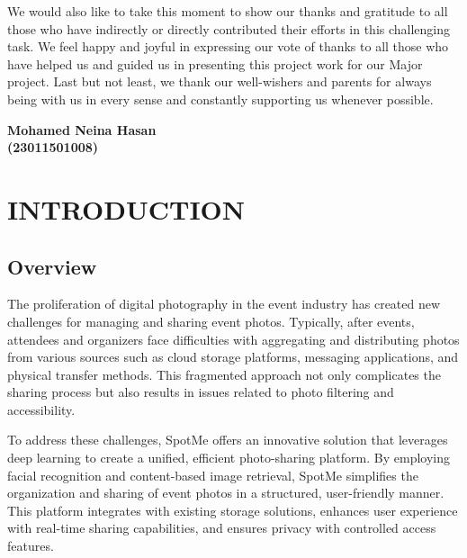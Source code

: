 \documentclass[12pt,a4paper]{report}
\begin{document}
We would also like to take this moment to show our thanks and gratitude to all those who have indirectly or directly contributed their efforts in this challenging task. We feel happy and joyful in expressing our vote of thanks to all those who have helped us and guided us in presenting this project work for our Major project. Last but not least, we thank our well-wishers and parents for always being with us in every sense and constantly supporting us whenever possible.

\vspace{2 cm}                        

\centering
\textbf{Mohamed Neina Hasan} \\
\textbf{(23011501008)}\\
\vspace{0.3cm}




\tableofcontents %
\newpage
\listoftables


\newpage
\listoffigures
{}

\newpage



\chapter{INTRODUCTION} \section{Overview} The proliferation of digital photography in the event industry has created new challenges for managing and sharing event photos. Typically, after events, attendees and organizers face difficulties with aggregating and distributing photos from various sources such as cloud storage platforms, messaging applications, and physical transfer methods. This fragmented approach not only complicates the sharing process but also results in issues related to photo filtering and accessibility.

To address these challenges, SpotMe offers an innovative solution that leverages deep learning to create a unified, efficient photo-sharing platform. By employing facial recognition and content-based image retrieval, SpotMe simplifies the organization and sharing of event photos in a structured, user-friendly manner. This platform integrates with existing storage solutions, enhances user experience with real-time sharing capabilities, and ensures privacy with controlled access features.
\end{document}
